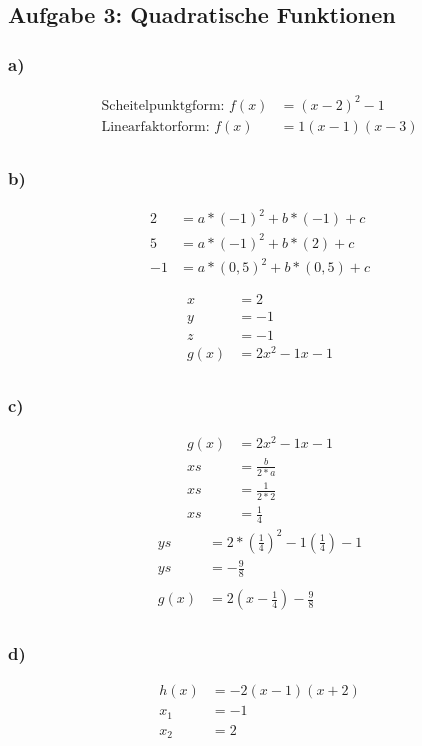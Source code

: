 \documentclass[a4paper]{article}
\begin{document}
\subsection*{\textbf{Aufgabe 3: Quadratische Funktionen}}
	\begin{minipage}{0.5\textwidth}
		\subsubsection*{a)}
		\begin{align*}	
			\text{Scheitelpunktgform: }f(x) &= (x - 2)^{2} - 1 \\	
			\text{Linearfaktorform: } f(x) &= 1(x - 1)(x - 3)	\\ 
		\end{align*}
		\subsubsection*{b)}
		\begin{align*}
			2 &= a * (-1)^{2} + b * (-1) + c \\
			5 &= a * (-1)^{2} + b * (2)  + c \\
			-1 &= a * (0,5)^{2} + b * (0,5) + c\\ \\
		\end{align*}
		\begin{align*}
			x &= 2 \\
			y &= -1 \\ 
			z &= -1 \\
			g(x) &= 2x^{2} - 1x -1\\
		\end{align*}
		\subsubsection*{c)}
		\begin{align*}
			g(x) &= 2x^{2} - 1x -1\\
			xs &= \frac{b}{2 * a} \\
			xs &= \frac{1}{2 * 2} \\
			xs &= \frac{1}{4}
		\end{align*}
		\begin{align*}
			ys &=  2 * (\frac{1}{4})^{2} - 1(\frac{1}{4}) - 1 \\
			ys &= -\frac{9}{8} \\ \\
			g(x) &= 2 (x - \frac{1}{4}) - \frac{9}{8} \\
		\end{align*}
		\subsubsection*{d)}
		\begin{align*}
			h(x) &= -2(x - 1)(x + 2)\\
			x_{1}&= -1 \\
			x_{2}&= 2 \\
		\end{align*}
	\end{minipage}
\end{document}
